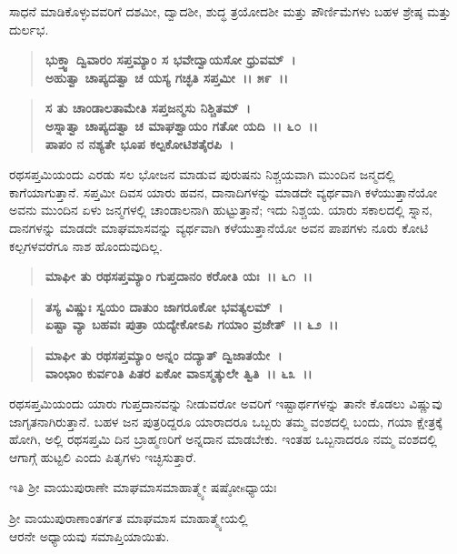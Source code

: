 ಸಾಧನೆ ಮಾಡಿಕೊಳ್ಳುವವರಿಗೆ ದಶಮೀ, ದ್ವಾದಶೀ, ಶುದ್ಧ ತ್ರಯೋದಶೀ ಮತ್ತು ಪೌರ್ಣಿಮೆಗಳು ಬಹಳ ಶ್ರೇಷ್ಠ ಮತ್ತು ದುರ್ಲಭ.

\begin{verse}
\textbf{ಭುಕ್ತ್ವಾ ದ್ವಿವಾರಂ ಸಪ್ತಮ್ಯಾಂ ಸ ಭವೇದ್ವಾಯಸೋ ಧ್ರುವಮ್~।}\\\textbf{ಅಹುತ್ವಾ ಚಾಪ್ಯದತ್ವಾ ಚ ಯಸ್ಯ ಗಚ್ಛತಿ ಸಪ್ತಮೀ~।। ೫೯~।।}
\end{verse}

\begin{verse}
\textbf{ಸ ತು ಚಾಂಡಾಲತಾಮೇತಿ ಸಪ್ತಜನ್ಮಸು ನಿಶ್ಚಿತಮ್~।}\\\textbf{ಅಸ್ನಾತ್ವಾ ಚಾಪ್ಯದತ್ವಾ ಚ ಮಾಘಶ್ವಾಯಂ ಗತೋ ಯದಿ~।। ೬೦~।। }\\\textbf{ಪಾಪಂ ನ ನಶ್ಯತೇ ಭೂಪ ಕಲ್ಪಕೋಟಿಶತೈರಪಿ~।}
\end{verse}

ರಥಸಪ್ತಮಿಯಂದು ಎರಡು ಸಲ ಭೋಜನ ಮಾಡುವ ಪುರುಷನು ನಿಶ್ಚಯವಾಗಿ ಮುಂದಿನ ಜನ್ಮದಲ್ಲಿ ಕಾಗೆಯಾಗುತ್ತಾನೆ. ಸಪ್ತಮೀ ದಿವಸ ಯಾರು ಹವನ, ದಾನಾದಿಗಳನ್ನು ಮಾಡದೇ ವ್ಯರ್ಥವಾಗಿ ಕಳೆಯುತ್ತಾನೆಯೋ ಅವನು ಮುಂದಿನ ಏಳು ಜನ್ಮಗಳಲ್ಲಿ ಚಾಂಡಾಲನಾಗಿ ಹುಟ್ಟುತ್ತಾನೆ; ಇದು ನಿಶ್ಚಯ. ಯಾರು ಸಕಾಲದಲ್ಲಿ ಸ್ನಾನ, ದಾನಗಳನ್ನು ಮಾಡದೇ ಮಾಘಮಾಸವನ್ನು ವ್ಯರ್ಥವಾಗಿ ಕಳೆಯುತ್ತಾನೆಯೋ ಅವನ ಪಾಪಗಳು ನೂರು ಕೋಟಿ ಕಲ್ಪಗಳವರೆಗೂ ನಾಶ ಹೊಂದುವುದಿಲ್ಲ.

\begin{verse}
\textbf{ಮಾಘೀ ತು ರಥಸಪ್ತಮ್ಯಾಂ ಗುಪ್ತದಾನಂ ಕರೋತಿ ಯಃ~।। ೬೧~।।} 
\end{verse}

\begin{verse}
\textbf{ತಸ್ಯ ವಿಷ್ಣುಃ ಸ್ವಯಂ ದಾತುಂ ಜಾಗರೂಕೋ ಭವತ್ಯಲಮ್~।}\\\textbf{ಏಷ್ಟಾ ವ್ಯಾ ಬಹವಃ ಪುತ್ರಾ ಯದ್ಯೇಕೋಽಪಿ ಗಯಾಂ ವ್ರಜೇತ್~।। ೬೨~।। }
\end{verse}

\begin{verse}
\textbf{ಮಾಘೀ ತು ರಥಸಪ್ತಮ್ಯಾಂ ಅನ್ನಂ ದದ್ಯಾತ್ ದ್ವಿಜಾತಯೇ~।}\\\textbf{ವಾಂಛಾಂ ಕುರ್ವಂತಿ ಪಿತರ ಏಕೋ ವಾಽಸ್ಮತ್ಕುಲೇ ತ್ವಿತಿ~।। ೬೩~।।}
\end{verse}

ರಥಸಪ್ತಮಿಯಂದು ಯಾರು ಗುಪ್ತದಾನವನ್ನು ನೀಡುವರೋ ಅವರಿಗೆ ಇಷ್ಟಾರ್ಥಗಳನ್ನು ತಾನೇ ಕೊಡಲು ವಿಷ್ಣುವು ಜಾಗೃತನಾಗಿರುತ್ತಾನೆ. ಬಹಳ ಜನ ಪುತ್ರರಿದ್ದರೂ ಯಾರಾದರೂ ಒಬ್ಬರು ತಮ್ಮ ವಂಶದಲ್ಲಿ ಬಂದು, ಗಯಾ ಕ್ಷೇತ್ರಕ್ಕೆ ಹೋಗಿ, ಅಲ್ಲಿ ರಥಸಪ್ತಮಿ ದಿನ ಬ್ರಾಹ್ಮಣರಿಗೆ ಅನ್ನದಾನ ಮಾಡಬೇಕು. ಇಂತಹ ಒಬ್ಬನಾದರೂ ನಮ್ಮ ವಂಶದಲ್ಲಿ ಆಗಾಗ್ಗೆ ಹುಟ್ಟಲಿ ಎಂದು ಪಿತೃಗಳು ಇಚ್ಛಿಸುತ್ತಾರೆ.

\begin{center}
ಇತಿ ಶ‍್ರೀ ವಾಯುಪುರಾಣೇ ಮಾಘಮಾಸಮಾಹಾತ್ಮ್ಯೇ ಷಷ್ಠೋsಧ್ಯಾಯಃ 
\end{center}

\begin{center}
ಶ‍್ರೀ ವಾಯುಪುರಾಣಾಂತರ್ಗತ ಮಾಘಮಾಸ ಮಾಹಾತ್ಮ್ಯೇಯಲ್ಲಿ \\ ಆರನೇ ಅಧ್ಯಾಯವು ಸಮಾಪ್ತಿಯಾಯಿತು.
\end{center}

